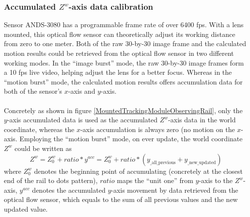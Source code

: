 \subsubsection{Accumulated \(Z^w\)-axis data calibration}
%
Sensor ANDS-3080 has a programmable frame rate of over 6400 fps. With a lens mounted, this optical flow sensor can theoretically adjust its working distance from zero to one meter. Both of the raw 30-by-30 image frame and the calculated motion results could be retrieved from the optical flow sensor in two different working modes. In the \enquote{image burst} mode, the raw 30-by-30 image frames form a 10 fps live video, helping adjust the lens for a better focus. Whereas in the \enquote{motion burst} mode, the calculated motion results offers accumulation data for both of the sensor's \(x\)-axis and \(y\)-axis.
\\\\%
Concretely as shown in figure \ref{MountedTrackingModuleObservingRail}, only the \(y\)-axis accumulated data is used as the accumulated \(Z^w\)-axis data in the world coordinate, whereas the \(x\)-axis accumulation is always zero (no motion on the \(x\)-axis. Employing the \enquote{motion burst} mode, on ever update, the world coordinate \(Z^w\) could be written as%
%
\begin{equation}
%
Z^w = Z^w_0 + ratio*y^{acc} = Z^w_0 + ratio*(y_{\text{\_all\_previous}} + y_{\text{\_new\_updated}})
%
\end{equation}
%
where \(Z^w_0\) denotes the beginning point of accumulating (concretely at the closest end of the rail to dots pattern), \(ratio\) maps the \enquote{unit one} from \(y\)-axis to the \(Z^w\)-axis, \(y^{acc}\) denotes the accumulated \(y\)-axis movement by data retrieved from the optical flow sensor, which equals to the sum of all previous values and the new updated value.
%
